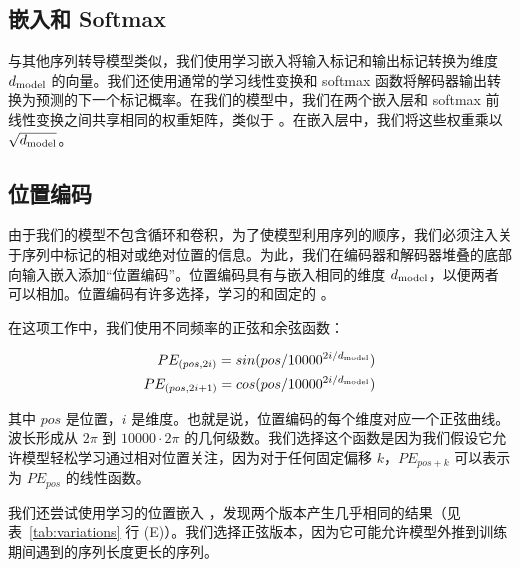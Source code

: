 \subsection{嵌入和 Softmax}
与其他序列转导模型类似，我们使用学习嵌入将输入标记和输出标记转换为维度 $d_{\text{model}}$ 的向量。我们还使用通常的学习线性变换和 softmax 函数将解码器输出转换为预测的下一个标记概率。在我们的模型中，我们在两个嵌入层和 softmax 前线性变换之间共享相同的权重矩阵，类似于 \citep{press2016using}。在嵌入层中，我们将这些权重乘以 $\sqrt{d_{\text{model}}}$。

\subsection{位置编码}
由于我们的模型不包含循环和卷积，为了使模型利用序列的顺序，我们必须注入关于序列中标记的相对或绝对位置的信息。为此，我们在编码器和解码器堆叠的底部向输入嵌入添加“位置编码”。位置编码具有与嵌入相同的维度 $d_{\text{model}}$，以便两者可以相加。位置编码有许多选择，学习的和固定的 \citep{JonasFaceNet2017}。

在这项工作中，我们使用不同频率的正弦和余弦函数：

\begin{align*}
    PE_{(pos,2i)} = sin(pos / 10000^{2i/d_{\text{model}}}) \\
    PE_{(pos,2i+1)} = cos(pos / 10000^{2i/d_{\text{model}}})
\end{align*}

其中 $pos$ 是位置，$i$ 是维度。也就是说，位置编码的每个维度对应一个正弦曲线。波长形成从 $2\pi$ 到 $10000 \cdot 2\pi$ 的几何级数。我们选择这个函数是因为我们假设它允许模型轻松学习通过相对位置关注，因为对于任何固定偏移 $k$，$PE_{pos+k}$ 可以表示为 $PE_{pos}$ 的线性函数。

我们还尝试使用学习的位置嵌入 \citep{JonasFaceNet2017}，发现两个版本产生几乎相同的结果（见表~\ref{tab:variations} 行 (E)）。我们选择正弦版本，因为它可能允许模型外推到训练期间遇到的序列长度更长的序列。

